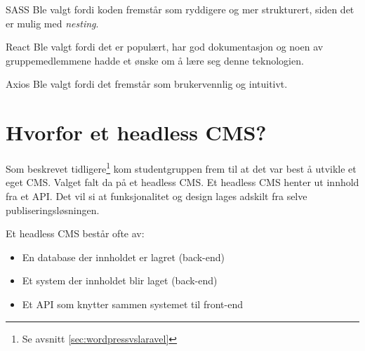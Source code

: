 \begin{compactdesc}
\item[SASS] Ble valgt fordi koden fremstår som ryddigere og mer strukturert, siden det er mulig med \textit{nesting}.
\item[React] Ble valgt fordi det er populært, har god dokumentasjon og noen av gruppemedlemmene hadde et ønske om å lære seg denne teknologien.
\item[Axios] Ble valgt fordi det fremstår som brukervennlig og intuitivt.
\end{compactdesc}


\section{Hvorfor et headless CMS?}
Som beskrevet tidligere\footnote{Se avsnitt \ref{sec:wordpressvslaravel}} kom studentgruppen frem til at det var best å utvikle et eget CMS. Valget falt da på et headless CMS. Et headless CMS henter ut innhold fra et API. Det vil si at funksjonalitet og design lages adskilt fra selve publiseringsløsningen.

Et headless CMS består ofte av:
\begin{itemize}
\item En database der innholdet er lagret (back-end)
\item Et system der innholdet blir laget (back-end)
\item Et API som knytter sammen systemet til front-end
\end{itemize}

